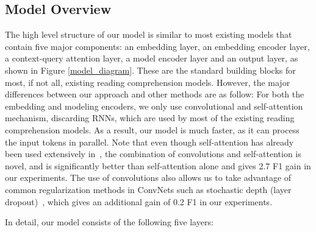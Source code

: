 \documentclass{article} \usepackage{iclr2018_conference,times}
\begin{document}
\subsection{Model Overview}
The high level structure of our model is similar to most existing models that contain five major components: an embedding layer, an embedding encoder layer, a context-query attention layer, a model encoder layer and an output layer, as shown in Figure \ref{model_diagram}. 
These are the standard building blocks for most, if not all, existing reading comprehension models. However, the major differences between our approach and other methods are as follow: 
For both the embedding and modeling encoders, we only use convolutional and self-attention mechanism, discarding RNNs, which are used by most of the existing reading comprehension models. As a result, our model is much faster, as it can process the input tokens in parallel. Note that even though self-attention has already been used extensively in~\cite{VaswaniSPUJGKP17}, the combination of convolutions and self-attention is novel, and is significantly better than self-attention alone and gives 2.7 F1 gain in our experiments. The use of convolutions also allows us to take advantage of common regularization methods in ConvNets such as stochastic depth (layer dropout)~\citep{HuangSLSW16}, which gives an additional gain of 0.2 F1 in our experiments.





In detail, our model consists of the following five layers:
\end{document}
